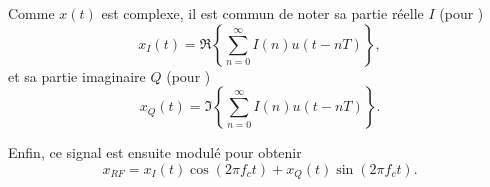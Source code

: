\documentclass [a4paper, 11pt] {article}
\begin{document}
    Comme $x(t)$ est complexe, il est commun de noter sa partie réelle $I$ (pour )
    \begin{equation}
        x_I(t) = \Re \left\{\sum\limits_{n=0}^{\infty}I(n) u(t-nT) \right\},
    \end{equation}
    et sa partie imaginaire $Q$ (pour )
    \begin{equation}
        x_Q(t) = \Im \left\{\sum\limits_{n=0}^{\infty}I(n) u(t-nT) \right\}.
    \end{equation}
    
    Enfin, ce signal est ensuite modulé pour obtenir
    \begin{equation}
        x_{RF} = x_I(t) \cos(2\pi f_c t) + x_Q(t)\sin(2\pi f_c t).
    \end{equation}
    
\end{document}
